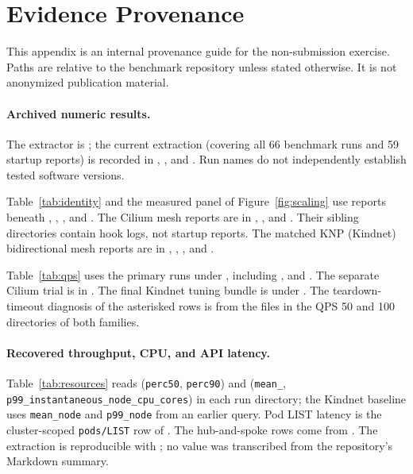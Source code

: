 \documentclass[letterpaper,twocolumn,10pt]{article}
\newcommand{\sys}{\textsc{KNP}}
\begin{document}
\clearpage
\appendix
\section{Evidence Provenance}
\label{sec:provenance}
This appendix is an internal provenance guide for the non-submission
exercise. Paths are relative to the benchmark repository unless
stated otherwise. It is not anonymized publication material.

\paragraph{Archived numeric results.}
The extractor is ; the current extraction
(covering all 66 benchmark runs and 59 startup reports) is recorded in
,
, and
. Run names do not
independently establish tested software versions.

Table~\ref{tab:identity} and the measured panel of
Figure~\ref{fig:scaling} use reports beneath
,
,
, and
. The Cilium mesh reports are in
,
, and
. Their sibling
 directories contain hook logs, not startup reports.
The matched \sys{} (Kindnet) bidirectional mesh reports are in
,
,
, and
.

Table~\ref{tab:qps} uses the primary runs under
, including
, and
.
The separate Cilium trial is in .
The final Kindnet tuning bundle is under
.
The teardown-timeout diagnosis of the asterisked rows is from the
 files in the QPS 50 and 100 directories of both
families.

\paragraph{Recovered throughput, CPU, and API latency.}
Table~\ref{tab:resources} reads 
(\texttt{perc50}, \texttt{perc90}) and
(\texttt{mean\_}, \texttt{p99\_instantaneous\_node\_cpu\_cores}) in
each run directory; the Kindnet baseline uses \texttt{mean\_node} and
\texttt{p99\_node} from an earlier query. Pod LIST latency is the
cluster-scoped \texttt{pods/LIST} row of
. The hub-and-spoke
rows come from .
The extraction is reproducible with ;
no value was transcribed from the repository's Markdown summary.
\end{document}
